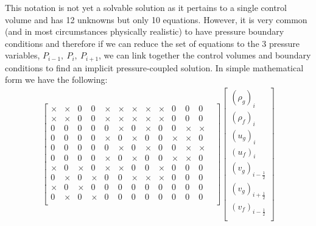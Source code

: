\documentclass[11pt,letterpaper,titlepage]{article}
\newcommand{\half}{\frac{1}{2}}
\begin{document}
\newpage
\noindent This notation is not yet a solvable solution as it pertains to a single control volume and has 12 unknowns but only 10 equations. However, it is very common (and in most circumstances physically realistic) to have pressure boundary conditions and therefore if we can reduce the set of equations to the 3 pressure variables, $P_{i-1}, \ P_i, \ P_{i+1}$, we can link together the control volumes and boundary conditions to find an implicit pressure-coupled solution. In simple mathematical form we have the following:
\begin{equation*}
\begin{aligned}
\begin{bmatrix}
\times &\times &0      &0      &\times &\times &\times &\times &\times &0      &0      &0      &  \\
\times &\times &0      &0      &\times &\times &\times &\times &\times &0      &0      &0      &  \\
0      &0      &0      &0      &0      &\times &0      &\times &0      &0      &\times &\times &  \\
0      &0      &0      &0      &\times &0      &\times &0      &0      &\times &\times &0      &  \\
0      &0      &0      &0      &0      &\times &0      &\times &0      &0      &\times &\times &  \\
0      &0      &0      &0      &\times &0      &\times &0      &0      &\times &\times &0      &  \\
\times &0      &\times &0      &\times &\times &0      &0      &\times &0      &0      &0      &  \\
0      &\times &0      &\times &0      &0      &\times &\times &\times &0      &0      &0      &  \\
\times &0      &\times &0      &0      &0      &0      &0      &0      &0      &0      &0      &  \\
0      &\times &0      &\times &0      &0      &0      &0      &0      &0      &0      &0      &  \\
\end{bmatrix}
\begin{bmatrix}
(\rho_g)_i  \\
(\rho_f)_i  \\
(u_g)_i \\
(u_f)_i \\
(v_g)_{i-\half}\\
(v_g)_{i+\half}\\
(v_f)_{i-\half}  \\

\end{bmatrix}
\end{aligned}
\end{equation*}
\end{document}
